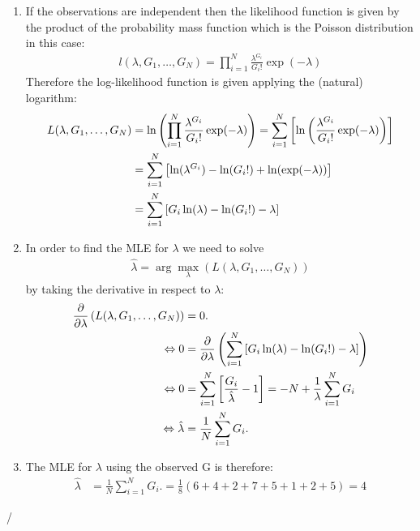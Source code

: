 \documentclass[12pt]{article}
\begin{document}
\begin{enumerate}
	\item If the observations are independent then the likelihood function is given by the product of the probability mass function which is the Poisson distribution in this case:
	\begin{align}
		l(\lambda, G_1,\dots, G_N)=\prod_{i=1}^{N}\frac{\lambda^{G_i}}{G_i!}\exp(-\lambda)
	\end{align}
	Therefore the log-likelihood function is given applying the (natural) logarithm:
	\begin{align}
		L(\lambda, G_1,\dots, G_N)&= \ln\left( \prod_{i=1}^{N}\frac{\lambda^{G_i}}{G_i!}\exp(-\lambda)  \right)= \sum_{i=1}^{N}\left[ \ln\left( \frac{\lambda^{G_i}}{G_i!}\exp(-\lambda) \right) \right] \notag \\
		&= \sum_{i=1}^{N}\left[  \ln(\lambda^{G_i})-\ln(G_i!)+\ln(\exp(-\lambda)) \right] \notag \\
		&= \sum_{i=1}^{N}\left[  G_i\ln(\lambda)-\ln(G_i!)-\lambda\right]
	\end{align}
	\item In order to find the MLE for $\lambda$ we need to solve
	\begin{align}
		\hat{\lambda}=\arg\max_\lambda(L(\lambda, G_1,\dots, G_N))
	\end{align}
	by taking the derivative in respect to $\lambda$:
	\begin{align}
		\frac{\partial}{\partial\lambda}\left( L(\lambda, G_1,\dots, G_N) \right) &= 0. \\ \notag
		\Leftrightarrow
		0 &= \frac{\partial}{\partial\lambda}\left(\sum_{i=1}^{N}\left[  G_i\ln(\lambda)-\ln(G_i!)-\lambda\right]  \right) \notag \\
		\Leftrightarrow
		0 &= \sum_{i=1}^{N}\left[  \frac{G_i}{\hat{\lambda}}-1\right] = -N + \frac{1}{\lambda}\sum_{i=1}^{N}G_i \notag \\
		\Leftrightarrow
		\hat{\lambda} &= \frac{1}{N}\sum_{i=1}^{N}G_i. 
	\end{align}
	\item The MLE for $\lambda$ using the observed G is therefore:
	\begin{align}
		\hat{\lambda} &= \frac{1}{N}\sum_{i=1}^{N}G_i. = \frac{1}{8}\left( 6+4+2+7+5+1+2+5 \right) = 4
	\end{align}
	
\end{enumerate}



%	




/
\end{document}
